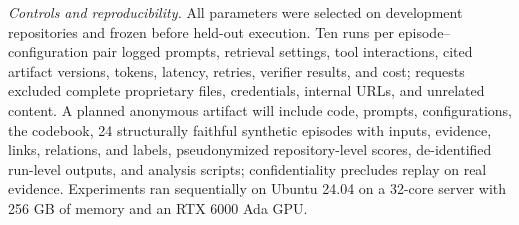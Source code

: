 \documentclass[10pt,conference]{IEEEtran}
\begin{document}
\noindent\textit{Controls and reproducibility.} All parameters were selected on development repositories and frozen before held-out execution. Ten runs per episode--configuration pair logged prompts, retrieval settings, tool interactions, cited artifact versions, tokens, latency, retries, verifier results, and cost; requests excluded complete proprietary files, credentials, internal URLs, and unrelated content. A planned anonymous artifact will include code, prompts, configurations, the codebook, 24 structurally faithful synthetic episodes with inputs, evidence, links, relations, and labels, pseudonymized repository-level scores, de-identified run-level outputs, and analysis scripts; confidentiality precludes replay on real evidence. Experiments ran sequentially on Ubuntu 24.04 on a 32-core server with 256 GB of memory and an RTX 6000 Ada GPU.\par
\end{document}
